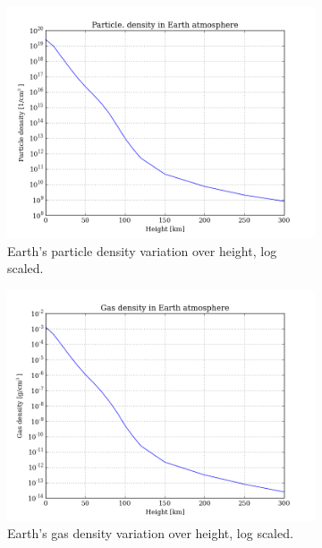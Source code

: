 \documentclass[11pt,a4paper,notitlepage]{article}
\begin{document}
\begin{figure}[H]
\begin{subfigure}[t]{0.49\textwidth}
	\includegraphics[scale=0.42]{../figs/earth_pardens.png}
	\caption{Earth's particle density variation over height, log scaled.}
	\end{subfigure}
	\hfill
	\begin{subfigure}[t]{0.49\textwidth}
	\includegraphics[scale=0.42]{../figs/earth_gasdens.png}
	\caption{Earth's gas density variation over height, log scaled.}
	\end{subfigure}
	
\caption{}
\end{figure}
\end{document}
